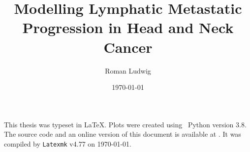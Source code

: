 \documentclass[
    a4paper,
    12pt,
    twoside,
    openright
]{report}
\title{Modelling Lymphatic Metastatic Progression in Head and Neck Cancer}
\author{Roman Ludwig}
\date{\monthyeardate\today}
\begin{document}
    \pagestyle{empty}
    
    \cleardoublepage
    \pagestyle{fancy}
    

    This thesis was typeset in \LaTeX. Plots were created using ~Python version 3.8. The source code and an online version of this document is available at . It was compiled by \texttt{Latexmk} v4.77 on \today.
\end{document}
